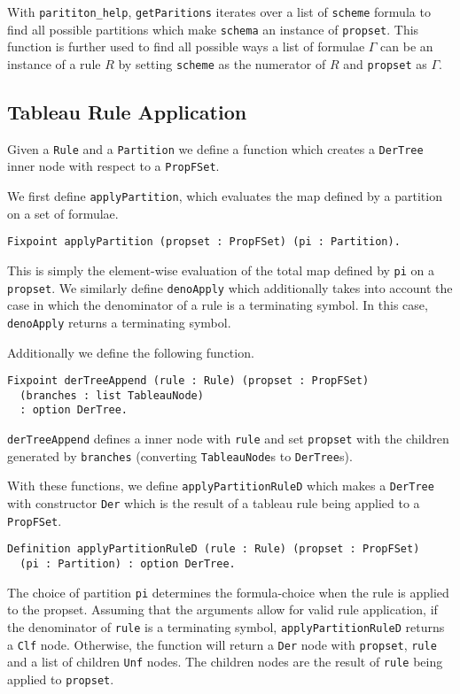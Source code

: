 \documentclass{llncs}
\begin{document}
With \verb+parititon_help+, \verb+getParitions+ iterates over a list of
\verb+scheme+ formula to find all possible partitions which make \verb+schema+
an instance of \verb+propset+. This function is further used to find all
possible ways a list of formulae $\Gamma$ can be an instance of a rule $R$ by
setting \verb+scheme+ as the numerator of $R$ and \verb+propset+ as $\Gamma$.
%
\subsection{Tableau Rule Application}
%
Given a \verb+Rule+ and a \verb+Partition+ we define a function which
creates a \verb+DerTree+ inner node with respect to a \verb+PropFSet+.

We first define \verb+applyPartition+, which evaluates the map defined by a
partition on a set of formulae.
%
\begin{verbatim}
Fixpoint applyPartition (propset : PropFSet) (pi : Partition).
\end{verbatim}
%
This is simply the element-wise evaluation of the total map defined by
\verb+pi+ on a \verb+propset+. We similarly define \verb+denoApply+ which
additionally takes into account the case in which the denominator of a rule is
a terminating symbol. In this case, \verb+denoApply+ returns a terminating
symbol.

Additionally we define the following function.
%
\begin{verbatim}
Fixpoint derTreeAppend (rule : Rule) (propset : PropFSet)
  (branches : list TableauNode)
  : option DerTree.
\end{verbatim}
%
\verb+derTreeAppend+ defines a inner node with \verb+rule+ and set
\verb+propset+ with the children generated by \verb+branches+ (converting
\verb+TableauNode+s to \verb+DerTree+s).

With these functions, we define \verb+applyPartitionRuleD+ which makes a
\verb+DerTree+ with constructor \verb+Der+  which is the result of a tableau
rule being applied to a \verb+PropFSet+.
%
\begin{verbatim}
Definition applyPartitionRuleD (rule : Rule) (propset : PropFSet)
  (pi : Partition) : option DerTree.
\end{verbatim}
%
The choice of partition \verb+pi+ determines the formula-choice when the rule
is applied to the propset. Assuming that the arguments allow for valid rule
application, if the denominator of \verb+rule+ is a terminating symbol,
\verb+applyPartitionRuleD+ returns a \verb+Clf+ node. Otherwise, the function
will return a \verb+Der+ node with \verb+propset+, \verb+rule+ and a list of
children \verb+Unf+ nodes. The children nodes are the result of \verb+rule+
being applied to \verb+propset+.
%
\end{document}
